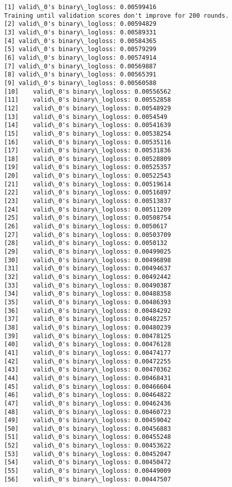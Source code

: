 \documentclass[11pt]{article}
\begin{document}
    \begin{Verbatim}[commandchars=\\\{\}]
[1]	valid\_0's binary\_logloss: 0.00599416
Training until validation scores don't improve for 200 rounds.
[2]	valid\_0's binary\_logloss: 0.00594829
[3]	valid\_0's binary\_logloss: 0.00589331
[4]	valid\_0's binary\_logloss: 0.00584365
[5]	valid\_0's binary\_logloss: 0.00579299
[6]	valid\_0's binary\_logloss: 0.00574914
[7]	valid\_0's binary\_logloss: 0.00569887
[8]	valid\_0's binary\_logloss: 0.00565391
[9]	valid\_0's binary\_logloss: 0.00560588
[10]	valid\_0's binary\_logloss: 0.00556562
[11]	valid\_0's binary\_logloss: 0.00552858
[12]	valid\_0's binary\_logloss: 0.00548929
[13]	valid\_0's binary\_logloss: 0.0054549
[14]	valid\_0's binary\_logloss: 0.00541639
[15]	valid\_0's binary\_logloss: 0.00538254
[16]	valid\_0's binary\_logloss: 0.00535116
[17]	valid\_0's binary\_logloss: 0.00531836
[18]	valid\_0's binary\_logloss: 0.00528809
[19]	valid\_0's binary\_logloss: 0.00525357
[20]	valid\_0's binary\_logloss: 0.00522543
[21]	valid\_0's binary\_logloss: 0.00519614
[22]	valid\_0's binary\_logloss: 0.00516897
[23]	valid\_0's binary\_logloss: 0.00513837
[24]	valid\_0's binary\_logloss: 0.00511209
[25]	valid\_0's binary\_logloss: 0.00508754
[26]	valid\_0's binary\_logloss: 0.0050617
[27]	valid\_0's binary\_logloss: 0.00503709
[28]	valid\_0's binary\_logloss: 0.0050132
[29]	valid\_0's binary\_logloss: 0.00499025
[30]	valid\_0's binary\_logloss: 0.00496898
[31]	valid\_0's binary\_logloss: 0.00494637
[32]	valid\_0's binary\_logloss: 0.00492442
[33]	valid\_0's binary\_logloss: 0.00490387
[34]	valid\_0's binary\_logloss: 0.00488358
[35]	valid\_0's binary\_logloss: 0.00486393
[36]	valid\_0's binary\_logloss: 0.00484292
[37]	valid\_0's binary\_logloss: 0.00482257
[38]	valid\_0's binary\_logloss: 0.00480239
[39]	valid\_0's binary\_logloss: 0.00478125
[40]	valid\_0's binary\_logloss: 0.00476128
[41]	valid\_0's binary\_logloss: 0.00474177
[42]	valid\_0's binary\_logloss: 0.00472255
[43]	valid\_0's binary\_logloss: 0.00470362
[44]	valid\_0's binary\_logloss: 0.00468431
[45]	valid\_0's binary\_logloss: 0.00466604
[46]	valid\_0's binary\_logloss: 0.00464822
[47]	valid\_0's binary\_logloss: 0.00462436
[48]	valid\_0's binary\_logloss: 0.00460723
[49]	valid\_0's binary\_logloss: 0.00459042
[50]	valid\_0's binary\_logloss: 0.00456883
[51]	valid\_0's binary\_logloss: 0.00455248
[52]	valid\_0's binary\_logloss: 0.00453622
[53]	valid\_0's binary\_logloss: 0.00452047
[54]	valid\_0's binary\_logloss: 0.00450472
[55]	valid\_0's binary\_logloss: 0.00449009
[56]	valid\_0's binary\_logloss: 0.00447507

\end{Verbatim}
\end{document}
